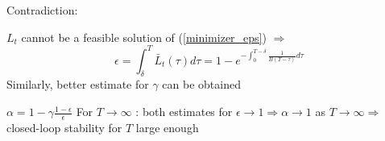 Contradiction:

$L_t$ cannot be a feasible solution of (\ref{minimizer_eps}) 
$\Rightarrow$ 
\begin{equation*}
\epsilon = \int_{\delta}^{T}\bar L_t(\tau)d\tau = 1 - e^{-\int_0^{T-\delta}\frac{1}{B(T-\tau)}d\tau}
\end{equation*}
Similarly, better estimate for $\gamma$ can be obtained

$\alpha = 1 - \gamma\frac{1-\epsilon}{\epsilon}$
For $T \to \infty$ : both estimates for $\epsilon \to 1 \Rightarrow \alpha \to 1$ as $T \to \infty \Rightarrow$ closed-loop stability for $T$ large enough 

